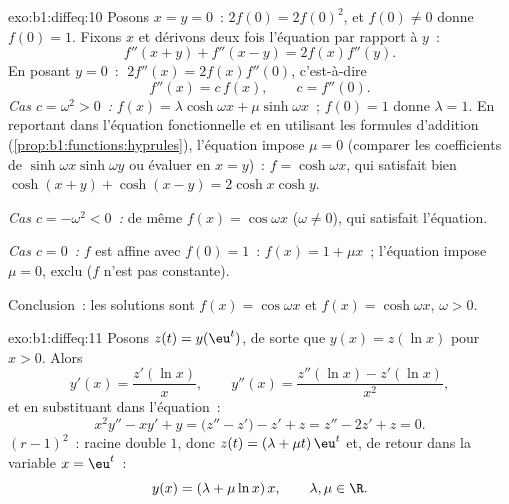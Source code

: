 \begin{solution}{exo:b1:diffeq:10}
Posons $x = y = 0$~: $2f(0) = 2f(0)^2$, et $f(0) \neq 0$ donne $f(0) =
1$. Fixons $x$ et dérivons deux fois l'équation par rapport à $y$~:
\[
f''(x+y) + f''(x-y) = 2 f(x) f''(y) .
\]
En posant $y = 0$~: $\;2f''(x) = 2 f(x) f''(0)$, c'est-à-dire
\[
f''(x) = c\,f(x), \qquad c = f''(0).
\]
\emph{Cas $c = \omega^2 > 0$~:} $f(x) = \lambda\cosh\omega x +
\mu\sinh\omega x$~; $f(0) = 1$ donne $\lambda = 1$. En reportant dans
l'équation fonctionnelle et en utilisant les formules d'addition
(\cref{prop:b1:functions:hyprules}), l'équation impose $\mu = 0$
(comparer les coefficients de $\sinh\omega x \sinh\omega y$ ou évaluer
en $x = y$)~: $f = \cosh\omega x$, qui satisfait bien
$\cosh(x+y) + \cosh(x-y) = 2\cosh x\cosh y$.

\emph{Cas $c = -\omega^2 < 0$~:} de même $f(x) = \cos\omega x$
($\omega \neq 0$), qui satisfait l'équation.

\emph{Cas $c = 0$~:} $f$ est affine avec $f(0) = 1$~: $f(x) = 1 + \mu
x$~; l'équation impose $\mu = 0$, exclu ($f$ n'est pas constante).

Conclusion~: les solutions sont $f(x) = \cos\omega x$ et $f(x) =
\cosh\omega x$, $\omega > 0$.
\end{solution}

\begin{solution}{exo:b1:diffeq:11}
Posons $z(t) = y(\eu^t)$, de sorte que $y(x) = z(\ln x)$ pour $x > 0$.
Alors
\[
y'(x) = \frac{z'(\ln x)}x,
\qquad
y''(x) = \frac{z''(\ln x) - z'(\ln x)}{x^2} ,
\]
et en substituant dans l'équation~:
\[
x^2y'' - xy' + y = \bigl(z'' - z'\bigr) - z' + z
= z'' - 2z' + z = 0 .
\]
 $(r - 1)^2$~: racine double $1$, donc $z(t) =
(\lambda + \mu t)\,\eu^t$ et, de retour dans la variable $x =
\eu^t$~:
\[
y(x) = (\lambda + \mu\ln x)\,x,
\qquad \lambda, \mu \in \R .
\]
\end{solution}

